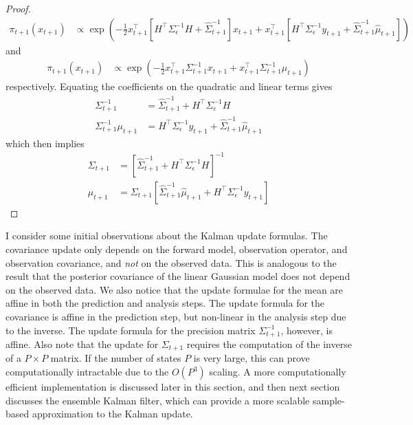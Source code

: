 \documentclass[12pt]{article}
\begin{document}
\begin{proof}
\begin{align*}
\pi_{t + 1}(x_{t + 1}) &\propto \exp\left(-\frac{1}{2} x_{t+1}^{\top}\left[H^\top \Sigma_{\epsilon}^{-1}H + \hat{\Sigma}_{t+1}^{-1} \right] x_{t+1} + x_{t+1}^{\top} \left[H^\top \Sigma_{\epsilon}^{-1}y_{t+1} + \hat{\Sigma}_{t+1}^{-1}\hat{\mu}_{t+1} \right] \right)
\end{align*}
and 
\begin{align*}
\pi_{t + 1}(x_{t + 1}) &\propto \exp\left(-\frac{1}{2} x_{t + 1}^\top \Sigma_{t+1}^{-1} x_{t+1} + x_{t+1}^\top \Sigma_{t+1}^{-1} \mu_{t+1} \right)
\end{align*}
respectively. Equating the coefficients on the quadratic and linear terms gives
\begin{align*}
\Sigma_{t + 1}^{-1} &= \hat{\Sigma}_{t+1}^{-1} + H^{\top} \Sigma_{\epsilon}^{-1} H \\
\Sigma_{t+1}^{-1} \mu_{t+1} &= H^\top \Sigma_{\epsilon}^{-1}y_{t+1} + \hat{\Sigma}_{t+1}^{-1}\hat{\mu}_{t+1}
\end{align*}
which then implies
\begin{align*}
\Sigma_{t+1} &= \left[\hat{\Sigma}_{t+1}^{-1} + H^{\top} \Sigma_{\epsilon}^{-1} H \right]^{-1} \\
\mu_{t + 1} &= \Sigma_{t+1} \left[\hat{\Sigma}_{t+1}^{-1}\hat{\mu}_{t+1} + H^{\top} \Sigma_{\epsilon}^{-1}y_{t+1} \right]
\end{align*}
\end{proof}
I consider some initial observations about the Kalman update formulas. The covariance update only depends on the forward model, 
observation operator, and observation covariance, and \textit{not} on the observed data. This is analogous to the result that the 
posterior covariance of the linear Gaussian model does not depend on the observed data. We also notice that the update formulae 
for the mean are affine in both the prediction and analysis steps. The update formula for the covariance is affine in the prediction 
step, but non-linear in the analysis step due to the inverse. The update formula for the precision matrix $\Sigma_{t+1}^{-1}$, however, 
is affine. Also note that the update for $\Sigma_{t+1}$ requires the computation of the inverse of a $P \times P$ matrix. If the number of 
states $P$ is very large, this can prove computationally intractable due to the $O(P^3)$ scaling. A more computationally efficient implementation 
is discussed later in this section, and then next section discusses the ensemble Kalman filter, which can provide a more scalable sample-based 
approximation to the Kalman update. 
\end{document}
